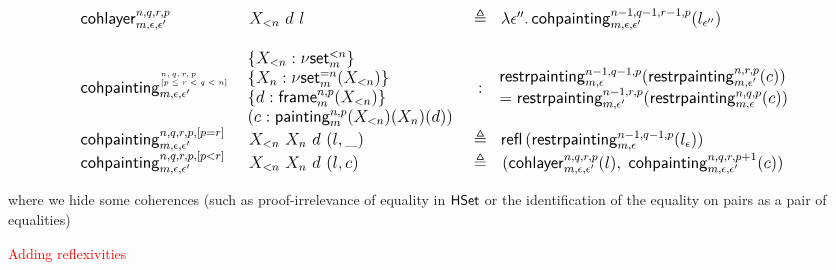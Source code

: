 \documentclass[12pt,landscape]{article}
\newcommand{\refl}[1]{\mathsf{refl}\,{#1}}
\newcommand{\defeq}{\triangleq}
\newcommand{\partialcubset}[2]{\mathsf{\nu set}_{#1}^{<#2}}
\newcommand{\mycubsetcomp}[2]{\mathsf{\nu set}_{#1}^{=#2}}
\newcommand{\mybox}[1]{\mathsf{frame}_{#1}}
\newcommand{\mycube}[1]{\mathsf{painting}_{#1}}
\newcommand{\downcube}[2]{\mathsf{restrpainting}_{#1,#2}}
\newcommand{\cohlayer}[2]{\mathsf{cohlayer}_{#1,#2}}
\newcommand{\cohcube}[2]{\mathsf{cohpainting}_{#1,#2}}
\begin{document}
\begin{Large}
\begin{sf}
$$\begin{large}
\begin{array}{llcl}
\cohlayer{m}{\epsilon,\epsilon'}^{n,q,r,p} & X_{<n}~d~l & \defeq & \lambda\epsilon''.\,\cohcube{m}{\epsilon,\epsilon'}^{n-1,q-1,r-1,p}(l_{\epsilon''})\\
\\
\cohcube{m}{\epsilon,\epsilon'}^{\!\!\!\tiny\begin{array}{l}n,q,r,p\\\mbox{}[p \leq r < q < n]\end{array}} & \!\!\!\begin{array}{l}\{X_{<n}:\partialcubset{m}{n}\}\\\{X_n:\mycubsetcomp{m}{n}(X_{<n})\}\\\{d:\mybox{m}^{n,p}(X_{<n})\}\\(c:\mycube{m}^{n,p}(X_{<n})(X_n)(d))\end{array}& : & \!\!\!\begin{array}{ll}\downcube{m}{\epsilon}^{n-1,q-1,p}(\downcube{m}{\epsilon'}^{n,r,p}(c)) \\ = \downcube{m}{\epsilon'}^{n-1,r,p}(\downcube{m}{\epsilon}^{n,q,p}(c))\end{array}\\
\cohcube{m}{\epsilon,\epsilon'}^{n,q,r,p,[p=r]} & X_{<n}~X_n~d~(l,\_) & \defeq & \refl({\downcube{m}{\epsilon}^{n-1,q-1,p}(l_{\epsilon})})\\
\cohcube{m}{\epsilon,\epsilon'}^{n,q,r,p,[p<r]} & X_{<n}~X_n~d~(l,c) & \defeq & \!\!\begin{array}{l}(\cohlayer{m}{\epsilon,\epsilon'}^{n,q,r,p}(l),\;\cohcube{m}{\epsilon,\epsilon'}^{n,q,r,p+1}(c))\end{array}\\
\end{array}
\end{large}
$$

\bigskip

\noindent where we hide some coherences (such as proof-irrelevance of
equality in $\mathsf{HSet}$ or the identification of the equality on pairs as
a pair of equalities)

\newpage

\begin{center}
\textcolor{red}{\huge Adding reflexivities}
\end{center}

\iffalse
\newcommand{\myreflset}{\textsf{reflSet}}


\end{sf}
\end{Large}
\end{document}

